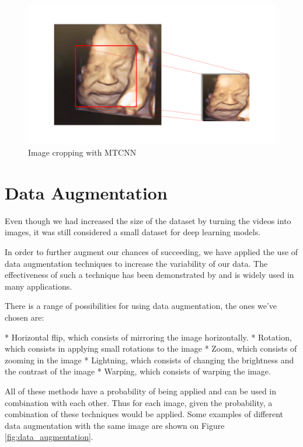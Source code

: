 \begin{figure}[h!tp]
    \centering
    \includegraphics[width=.9\textwidth]{imgs/chap3_cropping.png}
    \caption{Image cropping with MTCNN}
    \label{fig:cropping}
\end{figure}

\section{Data Augmentation}

Even though we had increased the size of the dataset by turning the videos into images, it was still considered a small dataset for deep learning models. 

In order to further augment our chances of succeeding, we have applied the use of data augmentation techniques to increase the variability of our data. The effectiveness of such a technique has been demonstrated by \cite{abs-1712-04621} and is widely used in many applications.

There is a range of possibilities for using data augmentation, the ones we've chosen are:

* Horizontal flip, which consists of mirroring the image horizontally. 
* Rotation, which consists in applying small rotations to the image
* Zoom, which consists of zooming in the image
* Lightning, which consists of changing the brightness and the contrast of the image
* Warping, which consists of warping the image. 

All of these methods have a probability of being applied and can be used in combination with each other. Thus for each image, given the probability, a combination of these techniques would be applied. Some examples of different data augmentation with the same image are shown on Figure \ref{fig:data_augmentation}.

